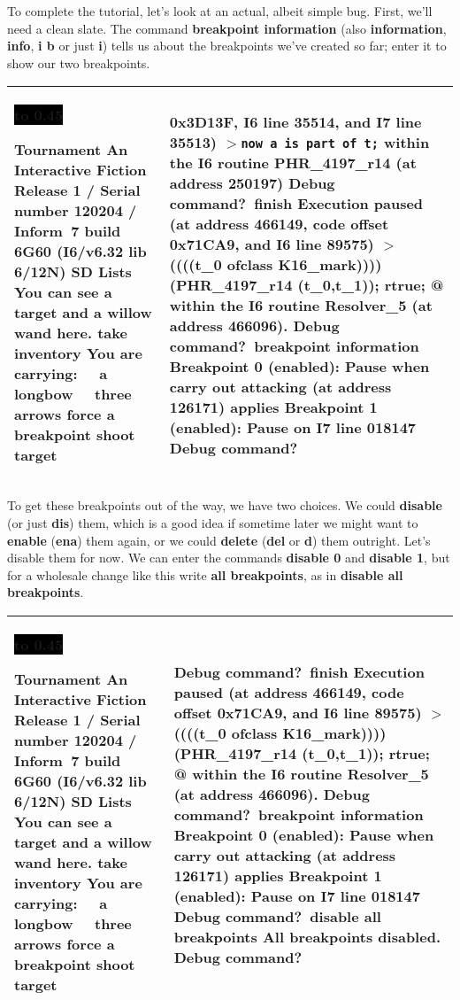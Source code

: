\documentclass{book}
\newcommand{\n}{\hspace*{\fill}\newline}
\newcommand{\terp}[2]{\begin{center}\begin{tabular}{p{0.45\textwidth}|p{0.45\textwidth}}\midrule #1&#2\\\midrule\end{tabular}\end{center}}
\newcommand{\glkheading}[1]{\textbf{#1}}
\newcommand{\glkinput}[1]{\textbf{#1}}
\newcommand{\glkstatusline}[2]{\centerline{\colorbox{black}{\hbox to 0.45\textwidth{\textcolor{white}{#1\hfil #2}}}}}
\newcommand{\storyprompt}{\raisebox{1.5pt}{\(>\)}}
\newcommand{\cursor}{\raisebox{-1.5pt}{\RectangleThin}}
\newcommand{\markedindent}{\(>\)\qquad}
\begin{document}
To complete the tutorial, let's look at an actual, albeit simple bug.  First,
we'll need a clean slate.  The command \glkinput{breakpoint information} (also
\glkinput{information}, \glkinput{info}, \glkinput{i b} or just \glkinput{i})
tells us about the breakpoints we've created so far; enter it to show our two
breakpoints.

\terp{\glkstatusline{Lists}{0/2}\n
  \glkheading{Tournament}\n
  An Interactive Fiction\n
  Release 1 / Serial number 120204 / Inform~7 build 6G60 (I6/v6.32 lib 6/12N) SD\n
  \n
  \glkheading{Lists}\n
  You can see a target and a willow wand here.\n
  \n
  \storyprompt\glkinput{take inventory}\n
  You are carrying:\n
  \null\ \ a longbow\n
  \null\ \ three arrows\n
  \n
  \storyprompt\glkinput{force a breakpoint}\n
  \storyprompt\glkinput{shoot target}}{%
  0x3D13F, I6 line 35514, and I7 line 35513)\n
  \markedindent \lstinline{now a is part of t;}\n
  within the I6 routine PHR\_4197\_r14 (at address 250197)\n
  \n
  Debug command?\ \glkinput{finish}\n
  \n
  Execution paused (at address 466149, code offset 0x71CA9, and I6 line 89575)\n
  \markedindent \lstinline@if ((((t\_0 ofclass K16\_mark)))) { (PHR\_4197\_r14 (t\_0,t\_1)); rtrue; }@\n
  within the I6 routine Resolver\_5 (at address 466096).\n
  \n
  Debug command?\ \glkinput{breakpoint information}\n
  \n
  Breakpoint 0 (enabled): Pause when carry out attacking (at address 126171) applies\n
  Breakpoint 1 (enabled): Pause on I7 line 018147\n
  \n
  Debug command?\ \cursor}

To get these breakpoints out of the way, we have two choices.  We could
\glkinput{disable} (or just \glkinput{dis}) them, which is a good idea if
sometime later we might want to \glkinput{enable} (\glkinput{ena}) them again,
or we could \glkinput{delete} (\glkinput{del} or \glkinput{d}) them outright.
Let's disable them for now.  We can enter the commands \glkinput{disable 0} and
\glkinput{disable 1}, but for a wholesale change like this write \glkinput{all
  breakpoints}, as in \glkinput{disable all breakpoints}.

\terp{\glkstatusline{Lists}{0/2}\n
  \glkheading{Tournament}\n
  An Interactive Fiction\n
  Release 1 / Serial number 120204 / Inform~7 build 6G60 (I6/v6.32 lib 6/12N) SD\n
  \n
  \glkheading{Lists}\n
  You can see a target and a willow wand here.\n
  \n
  \storyprompt\glkinput{take inventory}\n
  You are carrying:\n
  \null\ \ a longbow\n
  \null\ \ three arrows\n
  \n
  \storyprompt\glkinput{force a breakpoint}\n
  \storyprompt\glkinput{shoot target}}{%
  \n
  Debug command?\ \glkinput{finish}\n
  \n
  Execution paused (at address 466149, code offset 0x71CA9, and I6 line 89575)\n
  \markedindent \lstinline@if ((((t\_0 ofclass K16\_mark)))) { (PHR\_4197\_r14 (t\_0,t\_1)); rtrue; }@\n
  within the I6 routine Resolver\_5 (at address 466096).\n
  \n
  Debug command?\ \glkinput{breakpoint information}\n
  \n
  Breakpoint 0 (enabled): Pause when carry out attacking (at address 126171) applies\n
  Breakpoint 1 (enabled): Pause on I7 line 018147\n
  \n
  Debug command?\ \glkinput{disable all breakpoints}\n
  \n
  All breakpoints disabled.\n
  \n
  Debug command?\ \cursor}
\end{document}
